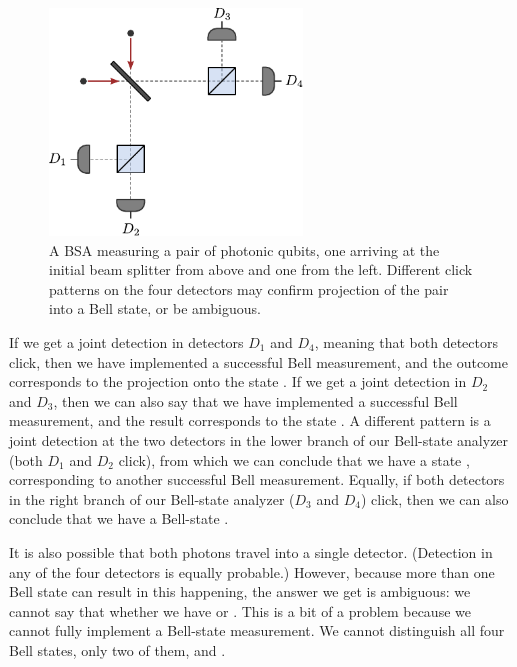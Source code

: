 \begin{figure}[t]
    \centering
    \includegraphics[width=0.6\textwidth]{lesson13/13-3_BSA_clicks.pdf}
    \caption[A four-detector Bell-state analyzer (BSA)]{A BSA measuring a pair of photonic qubits, one arriving at the initial beam splitter from above and one from the left.  Different click patterns on the four detectors may confirm projection of the pair into a Bell state, or be ambiguous.}
    \label{fig:13-BSA-clicks}
\end{figure}

If we get a joint detection in detectors $D_1$ and $D_4$, meaning that both detectors click, then we have implemented a successful Bell measurement, and the outcome corresponds to the projection onto the state \ket{\Psi^-}. If we get a joint detection in $D_2$ and $D_3$, then we can also say that we have implemented a successful Bell measurement, and the result corresponds to the state \ket{\Psi^-}. A different pattern is a joint detection at the two detectors in the lower branch of our Bell-state analyzer (both $D_1$ and $D_2$ click), from which we can conclude that we have a state \ket{\Psi^+}, corresponding to another successful Bell measurement. Equally, if both detectors in the right branch of our Bell-state analyzer ($D_3$ and $D_4$) click, then we can also conclude that we have a Bell-state \ket{\Psi^+}.

It is also possible that both photons travel into a single detector. (Detection in any of the four detectors is equally probable.) However, because more than one Bell state can result in this happening, the answer we get is ambiguous: we cannot say that whether we have \ket{\Phi^+} or \ket{\Phi^-}.
This is a bit of a problem because we cannot fully implement a Bell-state measurement. We cannot distinguish all four Bell states, only two of them, \ket{\Psi^+} and \ket{\Psi^-}.

